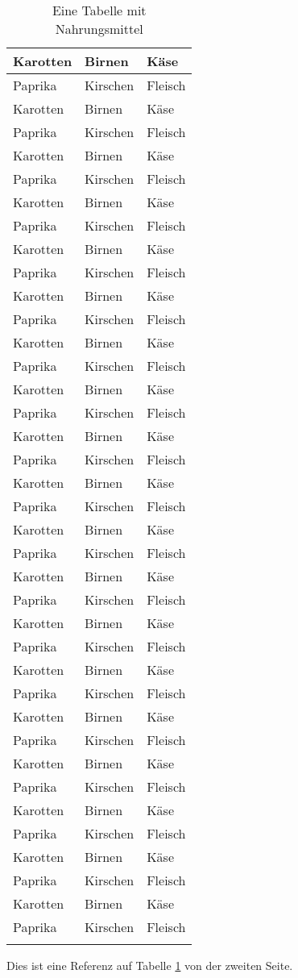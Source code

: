 \documentclass[12pt,a5paper,final]{article}
\begin{document}
\begin{longtable}{|l|l|l|}
	\hline Karotten & Birnen  &  Käse\\
	\hline	Paprika & Kirschen  & Fleisch \\
	\hline Karotten & Birnen  &  Käse\\
	\hline	Paprika & Kirschen  & Fleisch \\
	\hline Karotten & Birnen  &  Käse\\
	\hline	Paprika & Kirschen  & Fleisch \\
	\hline Karotten & Birnen  &  Käse\\
	\hline	Paprika & Kirschen  & Fleisch \\
	\hline Karotten & Birnen  &  Käse\\
	\hline	Paprika & Kirschen  & Fleisch \\
	\hline Karotten & Birnen  &  Käse\\
	\hline	Paprika & Kirschen  & Fleisch \\
	\hline Karotten & Birnen  &  Käse\\
	\hline	Paprika & Kirschen  & Fleisch \\
	\hline Karotten & Birnen  &  Käse\\
	\hline	Paprika & Kirschen  & Fleisch \\
	\hline Karotten & Birnen  &  Käse\\
	\hline	Paprika & Kirschen  & Fleisch \\
	\hline Karotten & Birnen  &  Käse\\
	\hline	Paprika & Kirschen  & Fleisch \\
	\hline Karotten & Birnen  &  Käse\\
	\hline	Paprika & Kirschen  & Fleisch \\
	\hline Karotten & Birnen  &  Käse\\
	\hline	Paprika & Kirschen  & Fleisch \\
	\hline Karotten & Birnen  &  Käse\\
	\hline	Paprika & Kirschen  & Fleisch \\
	\hline Karotten & Birnen  &  Käse\\
	\hline	Paprika & Kirschen  & Fleisch \\
	\hline Karotten & Birnen  &  Käse\\
	\hline	Paprika & Kirschen  & Fleisch \\
	\hline Karotten & Birnen  &  Käse\\
	\hline	Paprika & Kirschen  & Fleisch \\
	\hline Karotten & Birnen  &  Käse\\
	\hline	Paprika & Kirschen  & Fleisch \\
	\hline Karotten & Birnen  &  Käse\\
	\hline	Paprika & Kirschen  & Fleisch \\
	\hline Karotten & Birnen  &  Käse\\
	\hline	Paprika & Kirschen  & Fleisch \\
	\hline
	
	\caption{Eine Tabelle mit Nahrungsmittel}
	\label{tab:nahrungsmittel}
\end{longtable}
Dies ist eine Referenz auf Tabelle \ref{tab:nahrungsmittel} von der zweiten Seite. 
\end{document}
